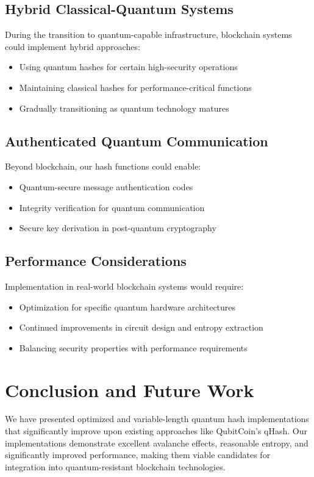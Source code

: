 \documentclass[conference]{IEEEtran}
\begin{document}
\subsection{Hybrid Classical-Quantum Systems}
During the transition to quantum-capable infrastructure, blockchain systems could implement hybrid approaches:
\begin{itemize}
    \item Using quantum hashes for certain high-security operations
    \item Maintaining classical hashes for performance-critical functions
    \item Gradually transitioning as quantum technology matures
\end{itemize}

\subsection{Authenticated Quantum Communication}
Beyond blockchain, our hash functions could enable:
\begin{itemize}
    \item Quantum-secure message authentication codes
    \item Integrity verification for quantum communication
    \item Secure key derivation in post-quantum cryptography
\end{itemize}

\subsection{Performance Considerations}
Implementation in real-world blockchain systems would require:
\begin{itemize}
    \item Optimization for specific quantum hardware architectures
    \item Continued improvements in circuit design and entropy extraction
    \item Balancing security properties with performance requirements
\end{itemize}

\section{Conclusion and Future Work}
We have presented optimized and variable-length quantum hash implementations that significantly improve upon existing approaches like QubitCoin's qHash. Our implementations demonstrate excellent avalanche effects, reasonable entropy, and significantly improved performance, making them viable candidates for integration into quantum-resistant blockchain technologies.
\end{document}
